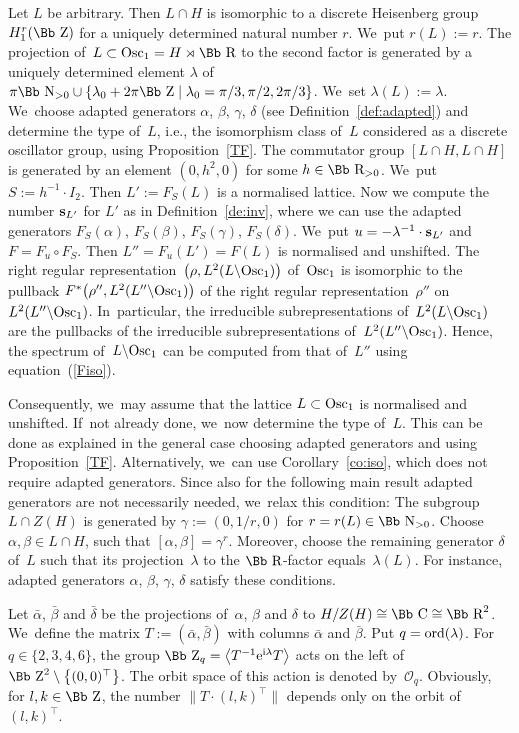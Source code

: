 \documentclass[10pt,a4paper]{amsart}
\newcommand\CC{{\mbox{\Bb C}}}
\newcommand\RR{{\mbox{\Bb R}}}
\newcommand\NN{{\mbox{\Bb N}}}
\newcommand\ZZ{{\mbox{\Bb Z}}}
\newcommand\bs{\textbf{{\rm \textbf{s}}}}
\newcommand{\Osc}{{\rm Osc}}
\newcommand{\ord}{{\rm ord}}
\newcommand\la{\langle}
\newcommand\ra{\rangle}
\numberwithin{equation}{section}
\begin{document}
Let $L$ be arbitrary. Then $L\cap H$ is isomorphic to a discrete Heisenberg group $H^r_1(\ZZ)$ for a uniquely determined natural number $r$. We~put $r(L):=r$. The projection of~$L\subset\Osc_1=H\rtimes\RR$ to the second factor is generated by a uniquely determined element $\lambda$ of~$\pi\NN_{>0}\cup \{\lambda_0+2\pi\ZZ\mid \lambda_0=\pi/3,\pi/2,2\pi/3\}$. We~set $\lambda(L):=\lambda$. We~choose adapted generators $\alpha$, $\beta$, $\gamma$, $\delta$ (see Definition~\ref{def:adapted}) and determine the type of~$L$, i.e., the isomorphism class of~$L$ considered as a discrete oscillator group, using Proposition~\ref{TF}.
The commutator group $[L\cap H, L\cap H]$ is generated by an element $(0,h^2,0)$ for some $h\in\RR_{>0}$. We~put $S:=h^{-1}\cdot I_2$. Then $L':=F_S(L)$ is a normalised lattice. Now we compute the number $\bs_{L'}$ for $L'$ as in Definition~\ref{de:inv}, where we can use the adapted generators $F_S(\alpha)$, $F_S(\beta)$, $F_S(\gamma)$, $F_S(\delta)$. We~put $u=-\lambda^{-1}\cdot\bs_{L'}$ and $F=F_u\circ F_S$.
Then $L''=F_u(L')=F(L)$ is normalised and unshifted.
The right regular representation~$\big(\rho,L^2(L\backslash\Osc_1)\big)$ of~$\Osc_1$ is isomorphic to the pullback $F^*\big(\rho'',L^2(L''\backslash\Osc_1)\big)$ of the right regular representation~$\rho''$ on~$L^2(L''\backslash\Osc_1)$. In~particular, the irreducible subrepresentations of~$L^2(L\backslash\Osc_1)$ are the pullbacks of the irreducible subrepresentations of~$L^2(L''\backslash\Osc_1)$. Hence, the spectrum of~$L\backslash \Osc_1$ can be computed from that of~$L''$ using equation~(\ref{Fiso}).

Consequently, we~may assume that the lattice $L\subset\Osc_1$ is normalised and unshifted. If~not already done, we~now determine the type of~$L$. This can be done as explained in the general case choosing adapted generators and using Proposition~\ref{TF}. Alternatively, we~can use Corollary~\ref{co:iso}, which does not require adapted generators.
Since also for the following main result adapted generators are not necessarily needed, we~relax this condition: The subgroup $L\cap Z(H)$ is generated by $\gamma:=(0,1/r,0)$ for $r=r(L)\in\NN_{>0}$. Choose $\alpha,\beta\in L\cap H$, such that $[\alpha,\beta]=\gamma^r$. Moreover, choose the remaining generator $\delta$ of~$L$ such that its projection~$\lambda$ to the $\RR$-factor equals~$\lambda(L)$.
For instance, adapted generators $\alpha$, $\beta$, $\gamma$, $\delta$ satisfy these conditions.

Let $\bar \alpha$, $\bar\beta$ and $\bar\delta$ be the projections of~$\alpha$, $\beta$ and $\delta$ to $H/Z(H)\cong \CC\cong\RR^2$. We~define the matrix $T:=(\bar\alpha,\bar\beta)$ with columns $\bar \alpha$ and $\bar \beta$.
Put $q=\ord(\lambda)$.
For $q\in\{2,3,4,6\}$, the group $\ZZ_q=\big\la T^{-1} {\rm e}^{{\rm i}\lambda} T\big\ra$ acts on the left of~$\ZZ^2\setminus \big\{(0,0)^\top\big\}$. The orbit space of this action is denoted by~${\mathcal O}_q$.
Obviously, for $l,k\in\ZZ$, the number $\big\|T\cdot (l,k)^\top\big\|$ depends only on the orbit of~$(l,k)^\top$.
\end{document}
